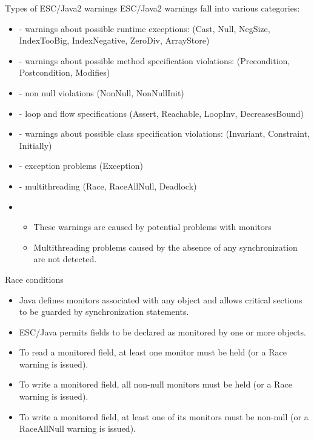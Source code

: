 \documentclass[
pdf,
nocolorBG,
slideColor,
cok,
]{prosper}
\begin{document}
\begin{slide}{Types of ESC/Java2 warnings}
\vspace*{-9ex}
ESC/Java2 warnings fall into various categories:
\begin{itemize}

\item[] - {\gray warnings about possible { runtime exceptions}:
(Cast, Null, NegSize, IndexTooBig, IndexNegative, ZeroDiv, ArrayStore)}

\item[] - {\gray warnings about possible method { specification violations}:
(Precondition, Postcondition, Modifies)}

\item[] - {\gray non null violations (NonNull, NonNullInit)}

\item[] - {\gray loop and flow specifications (Assert, Reachable, LoopInv, DecreasesBound)}

\item[] - { \gray warnings about possible class specification violations:
(Invariant, Constraint, Initially)}


\item[] - {\gray exception problems (Exception)}

\item[] - {\knalblue multithreading} (Race, RaceAllNull, Deadlock)
\item[]
\begin{itemize}
\item These warnings are caused by potential problems with monitors
\item Multithreading problems caused by the absence of any synchronization are not detected.
\end{itemize}

\end{itemize}
\end{slide}
\begin{slide}{Race conditions}

\vspace*{-6ex}
\begin{itemize}
\item Java defines monitors associated with any object and allows critical sections to be guarded by synchronization statements.
\item ESC/Java permits fields to be declared as {\blue monitored} by one or more objects.
\item To read a monitored field, at least one monitor must be held (or a Race warning is issued).
\item To write a monitored field, all non-null monitors must be held (or a Race warning is issued).
\item To write a monitored field, at least one of its monitors must be non-null (or a RaceAllNull warning is issued).
\end{itemize}
\end{slide}
\end{document}
